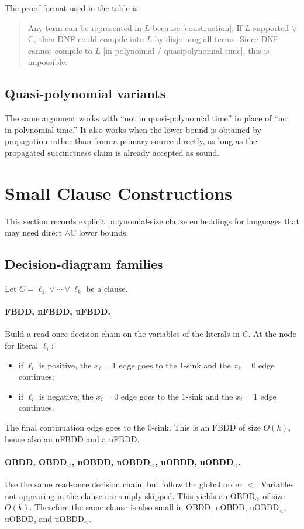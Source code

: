 \documentclass[11pt]{article}
\newcommand{\langref}[1]{\textbf{#1}}
\newcommand{\langfam}[2]{\textbf{#1$_{#2}$}}
\begin{document}
The proof format used in the table is:
\begin{quote}
Any term can be represented in $L$ because [construction]. If $L$ supported $\lor$C, then DNF could compile into $L$ by disjoining all terms. Since DNF cannot compile to $L$ [in polynomial / quasipolynomial time], this is impossible.
\end{quote}

\subsection{Quasi-polynomial variants}
The same argument works with ``not in quasi-polynomial time'' in place of ``not in polynomial time.''
It also works when the lower bound is obtained by propagation rather than from a primary source directly, as long as the propagated succinctness claim is already accepted as sound.

\section{Small Clause Constructions}
This section records explicit polynomial-size clause embeddings for languages that may need direct $\land$C lower bounds.

\subsection{Decision-diagram families}
Let $C = \ell_1 \lor \cdots \lor \ell_k$ be a clause.

\paragraph{\langref{FBDD}, \langref{nFBDD}, \langref{uFBDD}.}
Build a read-once decision chain on the variables of the literals in $C$.
At the node for literal $\ell_i$:
\begin{itemize}[noitemsep]
  \item if $\ell_i$ is positive, the $x_i=1$ edge goes to the 1-sink and the $x_i=0$ edge continues;
  \item if $\ell_i$ is negative, the $x_i=0$ edge goes to the 1-sink and the $x_i=1$ edge continues.
\end{itemize}
The final continuation edge goes to the 0-sink.
This is an FBDD of size $O(k)$, hence also an nFBDD and a uFBDD.

\paragraph{\langref{OBDD}, \langfam{OBDD}{<}, \langref{nOBDD}, \langfam{nOBDD}{<}, \langref{uOBDD}, \langfam{uOBDD}{<}.}
Use the same read-once decision chain, but follow the global order $<$.
Variables not appearing in the clause are simply skipped.
This yields an OBDD$_<$ of size $O(k)$.
Therefore the same clause is also small in OBDD, nOBDD, nOBDD$_<$, uOBDD, and uOBDD$_<$.
\end{document}
